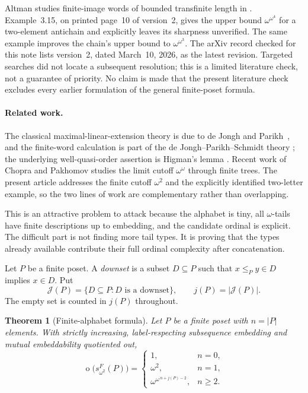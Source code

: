 \documentclass[11pt,a4paper]{article}
\numberwithin{equation}{section}
\newtheorem{theorem}{Theorem}[section]
\theoremstyle{definition}
\theoremstyle{remark}
\newcommand{\mot}{\mathop{o}}
\newcommand{\J}{\mathcal J}
\newcommand{\Wordspace}[1]{s_{\omega^2}^{F}(#1)}
\begin{document}
Altman studies finite-image words of bounded transfinite length in
\cite{Altman2026}. Example~3.15, on printed page~10 of version~2, gives the
upper bound $\omega^{\omega^4}$ for a two-element antichain and explicitly
leaves its sharpness unverified. The same example improves the chain's
upper bound to $\omega^{\omega^3}$. The arXiv record checked for this note
lists version~2, dated March~10, 2026, as the latest revision. Targeted
searches did not locate a subsequent resolution; this is a limited
literature check, not a guarantee of priority. No claim is made that the
present literature check excludes every earlier formulation of the general
finite-poset formula.

\paragraph{Related work.}
The classical maximal-linear-extension theory is due to de Jongh and
Parikh~\cite{deJonghParikh1977}, and the finite-word calculation is part of the
de Jongh--Parikh--Schmidt theory \cite{deJonghParikh1977,Schmidt2020}; the
underlying well-quasi-order assertion is Higman's lemma \cite{Higman1952}.
Recent work of Chopra and Pakhomov \cite{ChopraPakhomov2026} studies the limit
cutoff $\omega^\omega$ through finite trees. The present article addresses the
finite cutoff $\omega^2$ and the explicitly identified two-letter example, so
the two lines of work are complementary rather than overlapping.

This is an attractive problem to attack because the alphabet is tiny, all
$\omega$-tails have finite descriptions up to embedding, and the candidate
ordinal is explicit. The difficult part is not finding more tail types. It
is proving that the types already available contribute their full ordinal
complexity after concatenation.

Let $P$ be a finite poset. A \emph{downset} is a subset $D\subseteq P$ such
that $x\le_P y\in D$ implies $x\in D$. Put
\[
 \J(P)=\{D\subseteq P:D\text{ is a downset}\},\qquad j(P)=|\J(P)|.
\]
The empty set is counted in $j(P)$ throughout.

\begin{theorem}[Finite-alphabet formula]\label{thm:main}
Let $P$ be a finite poset with $n=|P|$ elements. With strictly increasing,
label-respecting subsequence embedding and mutual embeddability quotiented
out,
\begin{equation}\label{eq:main}
 \boxed{\mot\bigl(\Wordspace P\bigr)=
 \begin{cases}
  1,&n=0,\\
  \omega^2,&n=1,\\
  \omega^{\omega^{\,n+j(P)-2}},&n\ge2.
 \end{cases}}
\end{equation}
\end{theorem}
\end{document}
